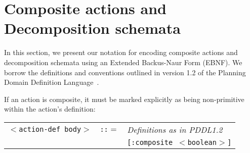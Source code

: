 \documentclass[10pt]{article}
\begin{document}
\section{Composite actions and Decomposition schemata}

\begin{flushleft}

In this section, we present our notation for encoding composite actions and decomposition schemata using an Extended Backus-Naur Form (EBNF).  We borrow the definitions and conventions outlined in version 1.2 of the Planning Domain Definition Language~\cite{mcdermott1998pddl}.

\end{flushleft}

\begin{flushleft}
If an action is composite, it must be marked explicitly as being non-primitive within the action's definition:

\begin{tabbing}
	\begin{tabular}{l l l}
		\texttt{$<$action-def body$>$} & \texttt{::$=$} & \textit{Definitions as in PDDL1.2~\cite{mcdermott1998pddl}}  \\
		& & \texttt{[:composite $<$boolean$>$]} \\
	\end{tabular}
\end{tabbing}


\end{flushleft}
\end{document}
